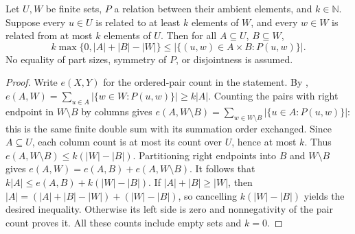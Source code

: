 \begin{lemma}
Let $U,W$ be finite sets, $P$ a relation between their ambient elements,
and $k\in\mathbb N$. Suppose every $u\in U$ is related to at least $k$
elements of $W$, and every $w\in W$ is related from at most $k$ elements
of $U$. Then for all $A\subseteq U$, $B\subseteq W$,
\[
 k\max\{0,|A|+|B|-|W|\}\leq
 |\{(u,w)\in A\times B:P(u,w)\}|.
\]
No equality of part sizes, symmetry of $P$, or disjointness is assumed.
\end{lemma}
\begin{proof}
Write $e(X,Y)$ for the ordered-pair count in the statement. By
,
$e(A,W)=\sum_{u\in A}|\{w\in W:P(u,w)\}|\geq k|A|$.
Counting the pairs with right endpoint in $W\setminus B$ by columns gives
$e(A,W\setminus B)=\sum_{w\in W\setminus B}|\{u\in A:P(u,w)\}|$:
this is the same finite double sum with its summation order exchanged.
Since $A\subseteq U$, each column count is at most its count over $U$,
hence at most $k$. Thus $e(A,W\setminus B)\leq k(|W|-|B|)$.
Partitioning right endpoints into $B$ and $W\setminus B$ gives
$e(A,W)=e(A,B)+e(A,W\setminus B)$. It follows that
$k|A|\leq e(A,B)+k(|W|-|B|)$.
If $|A|+|B|\geq |W|$, then
$|A|=(|A|+|B|-|W|)+(|W|-|B|)$, so cancelling
$k(|W|-|B|)$ yields the desired inequality. Otherwise its left side
is zero and nonnegativity of the pair count proves it. All these counts
include empty sets and $k=0$.
\end{proof}
